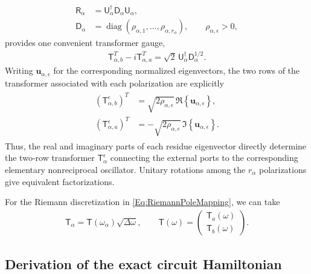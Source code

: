 \documentclass[prx,aps,twocolumn,article]{revtex4-2}
\newcommand{\msf}[1]{\mathsf{#1}}
\newcommand{\bsb}[1]{\boldsymbol{#1}}
\newcommand{\msT}{\msf{T}}
\newcommand{\msD}{\msf{D}}
\newcommand{\msU}{\msf{U}}
\newcommand{\msR}{\msf{R}}
\begin{document}
\begin{align}
    \msR_\alpha
    &=
    \msU_\alpha^\dag
    \msD_\alpha
    \msU_\alpha,
    \nonumber\\
    \msD_\alpha
    &=
    \operatorname{diag}
    \left(
        \rho_{\alpha,1},
        \ldots,
        \rho_{\alpha,r_\alpha}
    \right),
    \qquad
    \rho_{\alpha,\epsilon}>0,
    \label{Eq:ResidueEigendecomposition}
\end{align}
provides one convenient transformer gauge,
\begin{align}
    \msT_{\alpha,b}^T
    -
    i\msT_{\alpha,a}^T
    =
    \sqrt{2}\,
    \msU_\alpha^\dag
    \msD_\alpha^{1/2}.
    \label{Eq:TransformerEigenGauge}
\end{align}
Writing $\bsb{u}_{\alpha,\epsilon}$ for the corresponding normalized
eigenvectors, the two rows of the transformer associated with each
polarization are explicitly
\begin{align}
\begin{aligned}
    \left(
        \msT_{\alpha,b}^{\epsilon}
    \right)^T
    &=
    \sqrt{2\rho_{\alpha,\epsilon}}\,
    \Re\left\{
        \bsb{u}_{\alpha,\epsilon}
    \right\},
    \\
    \left(
        \msT_{\alpha,a}^{\epsilon}
    \right)^T
    &=
    -\sqrt{2\rho_{\alpha,\epsilon}}\,
    \Im\left\{
        \bsb{u}_{\alpha,\epsilon}
    \right\}.
\end{aligned}
\label{Eq:TransformerEigenPolarizations}
\end{align}
Thus, the real and imaginary parts of each residue eigenvector
directly determine the two-row transformer
$\msT_\alpha^\epsilon$ connecting the external ports to the
corresponding elementary nonreciprocal oscillator. Unitary rotations among the $r_\alpha$ polarizations give equivalent factorizations.

For the Riemann discretization in \cref{Eq:RiemannPoleMapping}, we can take
\begin{align}
    \msT_\alpha
    =
    \msT(\omega_\alpha)\sqrt{\Delta\omega},
    \qquad
    \msT(\omega)
    =
    \begin{pmatrix}
        \msT_a(\omega)\\
        \msT_b(\omega)
    \end{pmatrix}.
    \label{Eq:ContinuumTransformerDefinition}
\end{align}


\subsection{Derivation of the exact circuit Hamiltonian}
\label{Sec:CanonicalHamiltonian}
\end{document}
